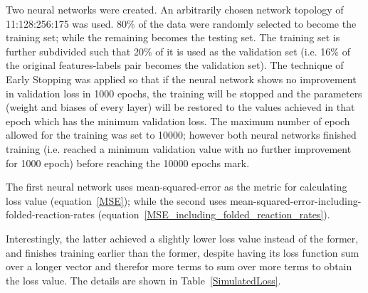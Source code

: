 \documentclass[a4paper, 12pt]{article}
\begin{document}
    Two neural networks were created. An arbitrarily chosen network topology of 11:128:256:175 was used. 80\% of the data were randomly selected to become the training set; while the remaining becomes the testing set. The training set is further subdivided such that 20\% of it is used as the validation set (i.e. 16\% of the original features-labels pair becomes the validation set). The technique of Early Stopping was applied so that if the neural network shows no improvement in validation loss in 1000 epochs, the training will be stopped and the parameters (weight and biases of every layer) will be restored to the values achieved in that epoch which has the minimum validation loss. The maximum number of epoch allowed for the training was set to 10000; however both neural networks finished training (i.e. reached a minimum validation value with no further improvement for 1000 epoch) before reaching the 10000 epochs mark.

    The first neural network uses mean-squared-error as the metric for calculating loss value (equation~\ref{MSE}); while the second uses mean-squared-error-including-folded-reaction-rates (equation~\ref{MSE_including_folded_reaction_rates}). 

    Interestingly, the latter achieved a slightly lower loss value instead of the former, and finishes training earlier than the former, despite having its loss function sum over a longer vector and therefor more terms to sum over more terms to obtain the loss value. The details are shown in Table~\ref{SimulatedLoss}.
\end{document}
